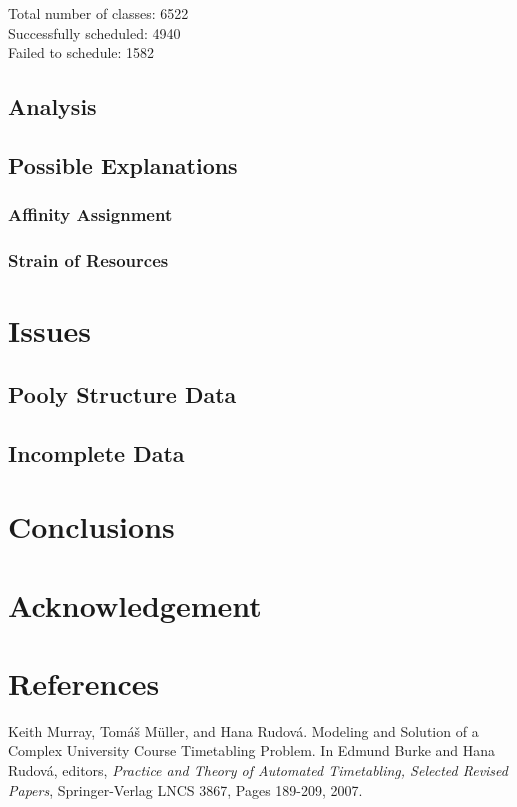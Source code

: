 \documentclass[12pt]{article}
\begin{document}
		Total number of classes: 6522 \\
		Successfully scheduled: 4940 \\
		Failed to schedule: 1582 \\

	\subsection{Analysis}

	\subsection{Possible Explanations}

		\subsubsection{Affinity Assignment}

		\subsubsection{Strain of Resources}

\section{Issues}

	\subsection{Pooly Structure Data}
	
	\subsection{Incomplete Data}

\section{Conclusions}

\section{Acknowledgement}

\section{References}
\begin{thebibliography}{9}
		Keith Murray, Tomáš Müller, and Hana Rudová.
		Modeling and Solution of a Complex University Course Timetabling Problem.
		In Edmund Burke and Hana Rudová, editors,
		\emph{Practice and Theory of Automated Timetabling, Selected Revised Papers},
		Springer-Verlag LNCS 3867,
		Pages 189-209,
		2007.
\end{thebibliography}
\end{document}
